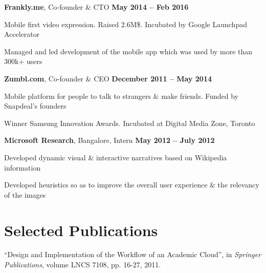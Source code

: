 \documentclass[margin,line]{resume}
\begin{document}
\begin{resume}
    \textbf{Frankly.me}, Co-founder \& CTO \hfill \textbf{May 2014 -- Feb 2016}
    \begin{list2}
        \item Mobile first video expression. Raised 2.6M\$. Incubated by Google Launchpad Accelerator
        \item Managed and led development of the mobile app which was used by more than 300k+ users
    \end{list2}\vspace{-1.5mm}

    \textbf{Zumbl.com}, Co-founder \& CEO \hfill \textbf{December 2011 -- May 2014}
    \begin{list2}
        \item Mobile platform for people to talk to strangers \& make friends. Funded by Snapdeal's founders
        \item Winner Samsung Innovation Awards. Incubated at Digital Media Zone, Toronto
    \end{list2}\vspace{-1.5mm}

    \textbf{Microsoft Research}, Bangalore, Intern \hfill \textbf{May 2012 -- July 2012}
    \begin{list2}
        \item Developed dynamic visual \& interactive narratives based on Wikipedia information
        \item Developed heuristics so as to improve the overall user experience \& the relevancy of the images
    \end{list2}\vspace{-1.5mm}

    \section{\mysidestyle Selected Publications}
    ``Design and Implementation of the Workflow of an Academic Cloud'',
    in \textsl{Springer Publications}, volume LNCS 7108, pp. 16-27, 2011.\vspace{-1.5mm}


\end{resume}
\end{document}
